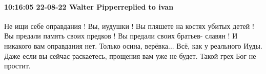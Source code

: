  
 
 
 
 

\paragraph{10:16:05 22-08-22 Walter Pipperreplied to ivan}

Не ищи себе оправдания ! Вы, иудушки ! Вы пляшете на костях убитых детей ! Вы
предали память своих предков ! Вы предали своих братьев- славян ! И никакого
вам оправдания нет. Только осина, верёвка... Всё, как у реального Иуды. Даже
если вы сейчас раскаетесь, прощения вам уже не будет. Такой грех Бог не
простит.
